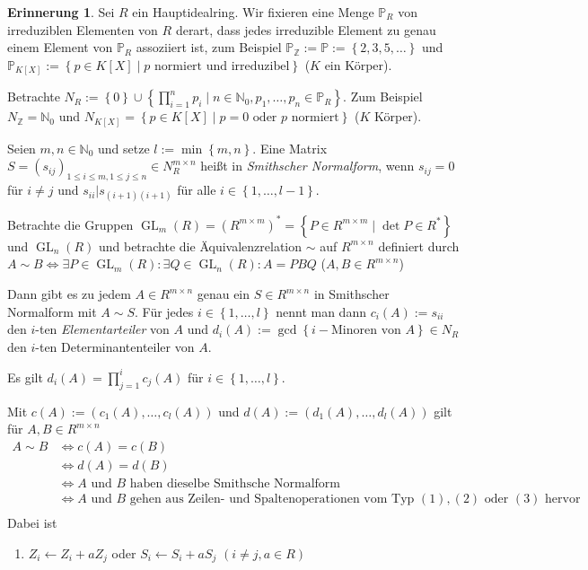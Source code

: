 \documentclass[
twoside=semi,
fontsize=12,
DIV=12, 
cleardoublepage=current,
leqno,
headings=optiontoheadandtoc, 
toc=idx
]{scrbook}
\newcommand{\N}{\mathbb{N}}
\newcommand{\Z}{\mathbb{Z}}
\renewcommand{\P}{\mathbb{P}}
\newcommand{\set}[1]{\left\{ #1 \right\}}
\DeclareMathOperator{\GL}{GL}
\theoremstyle{definition}
\newtheorem{erinnerung}[definition]{Erinnerung}
\begin{document}
	\begin{erinnerung}\label{1.6.4}\hfill\newline
		Sei $R$ ein Hauptidealring. Wir fixieren eine Menge $\P_R$ von irreduziblen Elementen von $R$ derart, dass jedes irreduzible Element zu genau einem Element von $\P_R$ assoziiert ist, zum Beispiel $\P_\Z := \P := \set{2,3,5,\dots}$ und $\P_{K[X]} := \set{p \in K[X] \mid p \textrm{ normiert und irreduzibel}}$ ($K$ ein K\"orper).
		
		\noindent Betrachte $\displaystyle N_R:= \set{0} \cup \set{\prod_{i=1}^np_i \mid n \in \N_0, p_1, \dots, p_n \in \P_R}$. Zum Beispiel $N_\Z = \N_0$ und $N_{K[X]} = \set{p\in K[X] \mid p= 0 \textrm{ oder } p \textrm{ normiert}}$ ($K$ K\"orper).
		
		Seien $m,n \in \N_0$ und setze $l := \min \set{m, n}$. Eine Matrix $S=(s_{ij})_{1\leq i \leq m, 1 \leq j \leq n} \in N_R^{m\times n}$ hei\ss t in \emph{Smithscher Normalform}, wenn $s_{ij} = 0$ f\"ur $i\neq j$ und $s_{ii} | s_{(i+1)(i+1)}$ f\"ur alle $i \in \set{1, \dots, l-1}$. 
		
		Betrachte die Gruppen $\GL_m(R) = (R^{m\times m})^* = \set{P \in R^{m \times m} \mid \det P \in R^*}$ und $\GL_n(R)$ und betrachte die \"Aquivalenzrelation $\sim$ auf $R^{m\times n}$ definiert durch \linebreak
		$A \sim B \Leftrightarrow \exists P \in \GL_m(R): \exists Q \in \GL_n(R): A=PBQ$ ($A, B \in R^{m \times n}$)
		
		
		Dann gibt es zu jedem $A \in R^{m \times n}$ genau ein $S \in R^{m\times n}$ in Smithscher Normalform mit $A \sim S$.
		F\"ur jedes $i \in \set{1, \dots, l}$ nennt man dann $c_i(A) := s_{ii}$ den $i$-ten \emph{Elementarteiler} von $A$ und $d_i(A) := \gcd\set{i-\textrm{Minoren von } A} \in N_R$ den $i$-ten Determinantenteiler von $A$.
		
		\medskip\noindent Es gilt $\displaystyle d_i(A) = \prod_{j=1}^i c_j(A)$ f\"ur $i \in \set{1, \dots, l}$. 
		
		\noindent Mit $c(A) := (c_1(A), \dots, c_l(A))$ und $d(A) := (d_1(A), \dots, d_l(A))$ gilt f\"ur $A, B \in R^{m\times n}$
			\begin{align*}
				A \sim B &\Leftrightarrow c(A) = c(B)\\
				&\Leftrightarrow d(A) = d(B)\\
				&\Leftrightarrow A \textrm{ und } B \textrm{ haben dieselbe Smithsche Normalform}\\
				&\Leftrightarrow A \textrm{ und } B \textrm{ gehen aus Zeilen- und Spaltenoperationen vom Typ } (1), (2) \textrm{ oder } (3) \textrm{ hervor}\\
			\end{align*} 
		Dabei ist 
			\begin{enumerate}[(1)]
				\item $Z_i \gets Z_i + aZ_j$ oder $S_i \gets S_i + aS_j$ \hfill $(i\neq j,a \in R)$
				

\end{enumerate}
\end{erinnerung}
\end{document}
